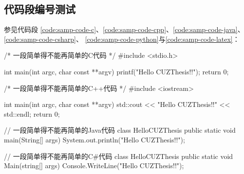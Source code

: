 \begin{appendices}
    \subsection{代码段编号测试} \label{subsec:testlistings}

    参见代码段
    \ref{code:samp-code-c}、\ref{code:samp-code-cpp}、\ref{code:samp-code-java}、\ref{code:samp-code-csharp}、
    \ref{code:samp-code-python}与\ref{code:samp-code-latex}：

    \begin{listing}[H]
        \centering
        \caption{一段简单得不能再简单的C代码}
        \label{code:samp-code-c}
        \begin{ccode}
            /* 一段简单得不能再简单的C代码 */
            #include <stdio.h>

            int main(int argc, char const **argv) {
                printf("Hello CUZThesis!!\n");
                return 0;
            }
        \end{ccode}
    \end{listing}

    \begin{listing}[H]
        \centering
        \caption{一段简单得不能再简单的C++代码}
        \label{code:samp-code-cpp}
        \begin{cppcode}
            /* 一段简单得不能再简单的C++代码 */
            #include <iostream>

            int main(int argc, char const **argv) {
                std::cout << "Hello CUZThesis!!" << std::endl;
                return 0;
            }
        \end{cppcode}
    \end{listing}

    \begin{listing}[H]
        \centering
        \caption{一段简单得不能再简单的Java代码}
        \label{code:samp-code-java}
        \begin{javacode}
            // 一段简单得不能再简单的Java代码
            class HelloCUZThesis {
                public static void main(String[] args) {
                    System.out.println("Hello CUZThesis!!");
                }
            }
        \end{javacode}
    \end{listing}

    \begin{listing}[H]
        \centering
        \caption{一段简单得不能再简单的C\#代码}
        \label{code:samp-code-csharp}
        \begin{cscode}
            // 一段简单得不能再简单的C#代码
            class HelloCUZThesis {
                public static void Main(string[] args) {
                    Console.WriteLine("Hello CUZThesis!!");
                }
            }
        \end{cscode}
    \end{listing}


\end{appendices}

